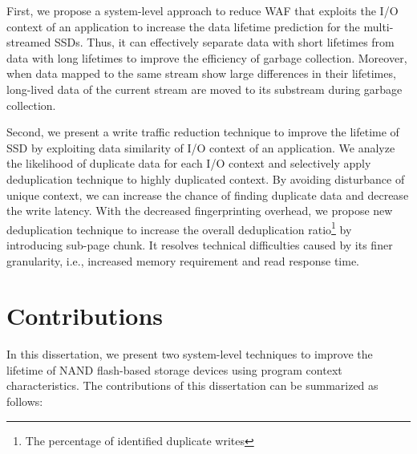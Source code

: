 First, we propose a system-level approach to reduce WAF that exploits
the I/O context of an application to increase the data lifetime prediction
for the multi-streamed SSDs. 
Thus, it can effectively separate data with
short lifetimes from data with long lifetimes to improve the efficiency of garbage collection.
Moreover, when data mapped to the same
stream show large differences in their lifetimes,
long-lived data of the current stream are moved to 
its substream during garbage collection.

Second, we present a write traffic reduction technique to improve the lifetime of 
SSD by exploiting data similarity of I/O context of an application. 
We analyze the likelihood of duplicate data for each I/O context and 
selectively apply deduplication technique to highly duplicated context.
By avoiding disturbance of unique context,
we can increase the chance of finding duplicate data and 
decrease the write latency.
With the decreased fingerprinting overhead, we propose new deduplication technique
to increase the overall
deduplication ratio\footnote{The percentage of identified duplicate writes}
by introducing sub-page chunk. 
It resolves technical difficulties caused by its finer granularity, i.e., 
increased memory requirement and read response time. 

\section{Contributions}
In this dissertation, we present two system-level techniques to improve the 
lifetime of NAND flash-based storage devices using program context characteristics. 
The contributions of this dissertation can be summarized as follows:

